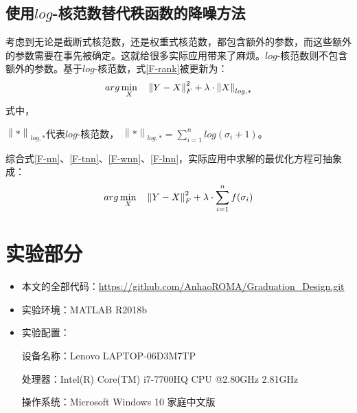 \documentclass[12pt, a4paper]{article}
\begin{document}
\subsection{使用$log$-核范数替代秩函数的降噪方法}
\par 考虑到无论是截断式核范数，还是权重式核范数，都包含额外的参数，而这些额外的参数需要在事先被确定。这就给很多实际应用带来了麻烦。$log$-核范数则不包含额外的参数。基于$log$-核范数，式\ref{F-rank}被更新为：
\begin{equation}
\centering
arg\min\limits_{X} \quad \left\|Y-X\right\|_F^2 + \lambda \cdot \left\|X\right\|_{log,*}
\label{F-lnn}
\end{equation}
式中，
\par$\left\|*\right\|_{log,*}$代表$log$-核范数，
$
\left\|*\right\|_{log,*} = \sum\limits_{i=1}^{n}log(\sigma_i+1)
$。
\newline
\newline
\par 综合式\ref{F-nn}、\ref{F-tnn}、\ref{F-wnn}、\ref{F-lnn}，实际应用中求解的最优化方程可抽象成：
\begin{displaymath}
\centering
arg\min\limits_{X} \quad \left\|Y-X\right\|_F^2 + \lambda \cdot \sum\limits_{i=1}^{n}f(\sigma_i)
\end{displaymath}
\newpage
\section{实验部分}\label{experiment}
\begin{itemize}
\item 本文的全部代码：{\url{https://github.com/AnhaoROMA/Graduation_Design.git}}
\item 实验环境：MATLAB R2018b
\item 实验配置：
\par 设备名称：Lenovo LAPTOP-06D3M7TP
\par 处理器：Intel(R) Core(TM) i7-7700HQ CPU @2.80GHz 2.81GHz
\par 操作系统：Microsoft Windows 10 家庭中文版
\end{itemize}
\end{document}
